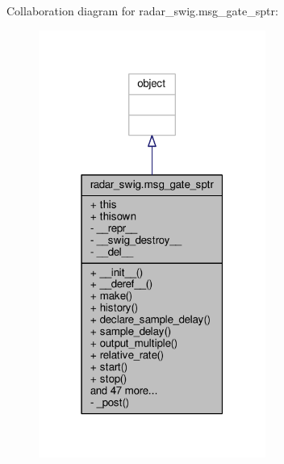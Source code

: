 Collaboration diagram for radar\+\_\+swig.\+msg\+\_\+gate\+\_\+sptr\+:
\nopagebreak
\begin{figure}[H]
\begin{center}
\leavevmode
\includegraphics[width=211pt]{d8/d87/classradar__swig_1_1msg__gate__sptr__coll__graph}
\end{center}
\end{figure}
